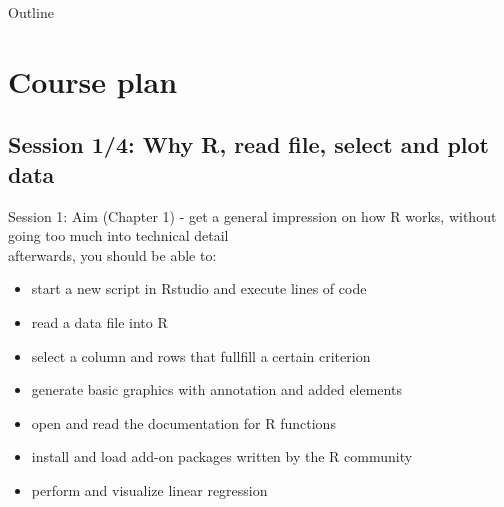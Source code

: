\documentclass[xcolor=table,           xcolor=dvipsnames]{beamer}\usepackage[]{graphicx}\usepackage[]{color}
\begin{document}

\begin{frame}{Outline}
\tableofcontents[hideallsubsections]
\label{toc}
\end{frame}

\section{Course plan}

\subsection{Session 1/4: Why R, read file, select and plot data}

\begin{frame}{Session 1: Aim (Chapter 1)}
\pause - get a general impression on how R works, without going too much into technical detail\\
\pause afterwards, you should be able to:
\pause
\begin{itemize}[<+->]
\item start a new script in Rstudio and execute lines of code
\item read a data file into R
\item select a column and rows that fullfill a certain criterion
\item generate basic graphics with annotation and added elements
\item open and read the documentation for R functions
\item install and load add-on packages written by the R community
\item perform and visualize linear regression
\end{itemize}
\end{frame}

\end{document}
